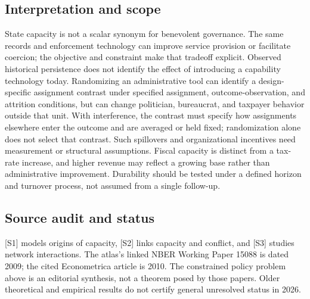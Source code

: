 \documentclass[11pt,a4paper]{article}
\begin{document}
\subsection*{Interpretation and scope}
State capacity is not a scalar synonym for benevolent governance. The same records and enforcement technology can improve service provision or facilitate coercion; the objective and constraint make that tradeoff explicit. Observed historical persistence does not identify the effect of introducing a capability technology today. Randomizing an administrative tool can identify a design-specific assignment contrast under specified assignment, outcome-observation, and attrition conditions, but can change politician, bureaucrat, and taxpayer behavior outside that unit. With interference, the contrast must specify how assignments elsewhere enter the outcome and are averaged or held fixed; randomization alone does not select that contrast. Such spillovers and organizational incentives need measurement or structural assumptions. Fiscal capacity is distinct from a tax-rate increase, and higher revenue may reflect a growing base rather than administrative improvement. Durability should be tested under a defined horizon and turnover process, not assumed from a single follow-up.
\subsection*{Source audit and status}
[S1] models origins of capacity, [S2] links capacity and conflict, and [S3] studies network interactions. The atlas's linked NBER Working Paper 15088 is dated 2009; the cited Econometrica article is 2010. The constrained policy problem above is an editorial synthesis, not a theorem posed by those papers. Older theoretical and empirical results do not certify general unresolved status in 2026.
\end{document}
